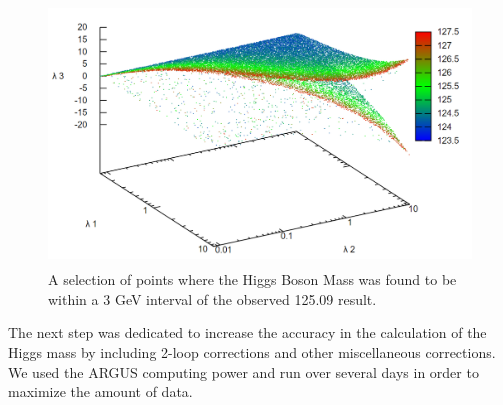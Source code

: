 \documentclass[12pt]{article}
\begin{document}
\begin{figure}[H]
 \centering
  \includegraphics[width=\linewidth,height=7cm,keepaspectratio]{masscert.png}
  \caption{A selection of points where the Higgs Boson Mass was found to be within a 3 GeV interval of the observed 125.09 result.}\label{fig:masscerta}
\end{figure}  
%
The next step was  dedicated to increase the accuracy in the calculation of the Higgs mass by including 2-loop corrections and other miscellaneous corrections. We used the ARGUS computing power and run over several days in order to maximize the amount of data.
%
\end{document}
